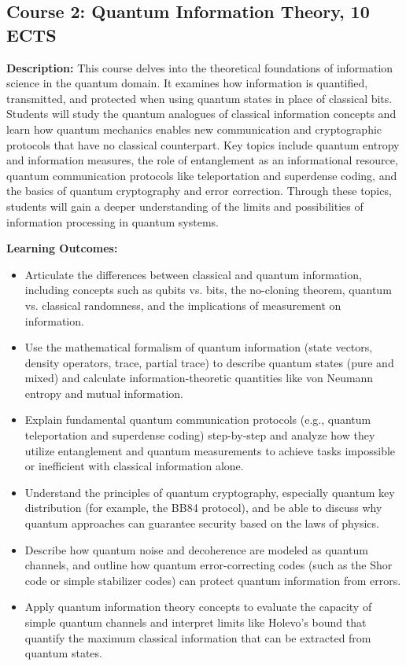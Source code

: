 \documentclass{scrreprt}
\begin{document}
\subsection{Course 2: Quantum Information Theory, 10 ECTS}

\textbf{Description:} This course delves into the theoretical foundations of information science in the quantum domain. It examines how information is quantified, transmitted, and protected when using quantum states in place of classical bits. Students will study the quantum analogues of classical information concepts and learn how quantum mechanics enables new communication and cryptographic protocols that have no classical counterpart. Key topics include quantum entropy and information measures, the role of entanglement as an informational resource, quantum communication protocols like teleportation and superdense coding, and the basics of quantum cryptography and error correction. Through these topics, students will gain a deeper understanding of the limits and possibilities of information processing in quantum systems.

\textbf{Learning Outcomes:}
\begin{itemize}
\item Articulate the differences between classical and quantum information, including concepts such as qubits vs. bits, the no-cloning theorem, quantum vs. classical randomness, and the implications of measurement on information.
\item Use the mathematical formalism of quantum information (state vectors, density operators, trace, partial trace) to describe quantum states (pure and mixed) and calculate information-theoretic quantities like von Neumann entropy and mutual information.
\item Explain fundamental quantum communication protocols (e.g., quantum teleportation and superdense coding) step-by-step and analyze how they utilize entanglement and quantum measurements to achieve tasks impossible or inefficient with classical information alone.
\item Understand the principles of quantum cryptography, especially quantum key distribution (for example, the BB84 protocol), and be able to discuss why quantum approaches can guarantee security based on the laws of physics.
\item Describe how quantum noise and decoherence are modeled as quantum channels, and outline how quantum error-correcting codes (such as the Shor code or simple stabilizer codes) can protect quantum information from errors.
\item Apply quantum information theory concepts to evaluate the capacity of simple quantum channels and interpret limits like Holevo’s bound that quantify the maximum classical information that can be extracted from quantum states.
\end{itemize}
\end{document}
